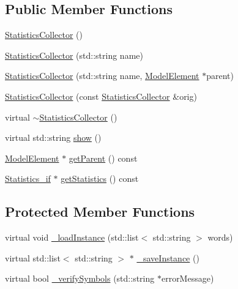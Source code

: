 \subsection*{Public Member Functions}
\begin{DoxyCompactItemize}
\item 
\hyperlink{class_statistics_collector_a2129c2bd19f9d64814fbfe18974a6d2e}{Statistics\+Collector} ()
\item 
\hyperlink{class_statistics_collector_acbb20e7e94252ff7105de7b0cdecb7ee}{Statistics\+Collector} (std\+::string name)
\item 
\hyperlink{class_statistics_collector_a270668f12d5d16f21f1a57a944504111}{Statistics\+Collector} (std\+::string name, \hyperlink{class_model_element}{Model\+Element} $\ast$parent)
\item 
\hyperlink{class_statistics_collector_a25e8def6d91decdf48d7c0fedb4382dc}{Statistics\+Collector} (const \hyperlink{class_statistics_collector}{Statistics\+Collector} \&orig)
\item 
virtual \hyperlink{class_statistics_collector_aef9244a0c9f715bc19136d283b759c6e}{$\sim$\+Statistics\+Collector} ()
\item 
virtual std\+::string \hyperlink{class_statistics_collector_a7ce8dad7e29d06c73a01d2ddee93fe00}{show} ()
\item 
\hyperlink{class_model_element}{Model\+Element} $\ast$ \hyperlink{class_statistics_collector_a38791d35ae91285f6e8ed04f86cdce8f}{get\+Parent} () const 
\item 
\hyperlink{class_statistics__if}{Statistics\+\_\+if} $\ast$ \hyperlink{class_statistics_collector_a8150e75713026e48f5add4d941a1cd34}{get\+Statistics} () const 
\end{DoxyCompactItemize}
\subsection*{Protected Member Functions}
\begin{DoxyCompactItemize}
\item 
virtual void \hyperlink{class_statistics_collector_aa13d2bc6d9deeffa9667388ae3e4f962}{\+\_\+load\+Instance} (std\+::list$<$ std\+::string $>$ words)
\item 
virtual std\+::list$<$ std\+::string $>$ $\ast$ \hyperlink{class_statistics_collector_a66eed8e1bd0316588575aa7310ac028b}{\+\_\+save\+Instance} ()
\item 
virtual bool \hyperlink{class_statistics_collector_a5aeefa5028a2b6a0157db55c0dfc7419}{\+\_\+verify\+Symbols} (std\+::string $\ast$error\+Message)
\end{DoxyCompactItemize}
